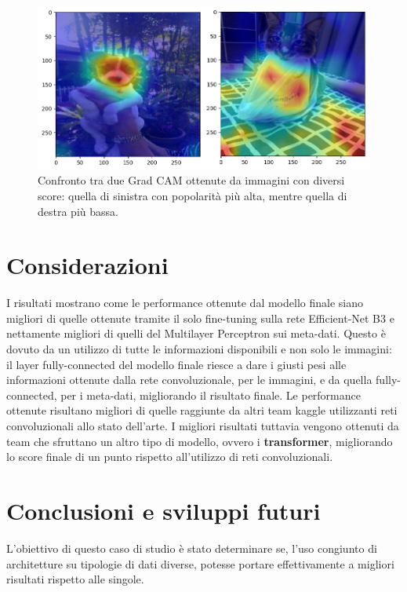 \begin{figure}[h]
        \centering
        \includegraphics[scale=0.6]{Plot/GRAD-CAM.png}
        \caption{Confronto tra due Grad CAM ottenute da immagini con diversi score: quella di sinistra con popolarità più alta, mentre quella di destra più bassa.}
        \label{fig:grad-cam}
\end{figure}
    


\section{Considerazioni}

I risultati mostrano come le performance ottenute dal modello finale siano migliori di quelle ottenute tramite il solo fine-tuning sulla rete Efficient-Net B3 e nettamente migliori di quelli del Multilayer Perceptron sui meta-dati. Questo è dovuto da un utilizzo di tutte le informazioni disponibili e non solo le immagini: il layer fully-connected del modello finale riesce a dare i giusti pesi alle informazioni ottenute dalla rete convoluzionale, per le immagini, e da quella fully-connected, per i meta-dati, migliorando il risultato finale. Le performance ottenute risultano migliori di quelle raggiunte da altri team kaggle utilizzanti reti convoluzionali allo stato dell'arte. I migliori risultati tuttavia vengono ottenuti da team che sfruttano un altro tipo di modello, ovvero i \textbf{transformer}, migliorando lo score finale di un punto rispetto all'utilizzo di reti convoluzionali.


\section{Conclusioni e sviluppi futuri}
L'obiettivo di questo caso di studio è stato determinare se, l'uso congiunto di architetture su tipologie di dati diverse, potesse portare effettivamente a migliori risultati rispetto
alle singole.

